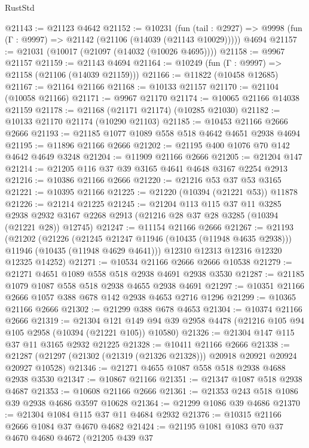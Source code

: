 \begin{lexlean}{RustStd}
\begin{coremodule}
{\begin{coremodule}
{{{{{{{{{{{{{{{{{{{{{{{{{{{{{{{{{{{{{{{{{{{{{{{{{{{{{{{{{{{{{{{{{{{{{{{{{{{{{{@21143 := @21123 @4642
@21152 := @10231
    (fun (tail : @2927) => @9998 (fun (Γ : @9997) => @21142 (@21106 (@14039 (@21143 @10029)))))
    @4694
@21157 := @21031 (@10017 (@21097 (@14032 (@10026 @4695))))
@21158 := @9967 @21157
@21159 := @21143 @4694
@21164 := @10249 (fun (Γ : @9997) => @21158 (@21106 (@14039 @21159)))
@21166 := @11822 (@10458 @12685)
@21167 := @21164 @21166
@21168 := @10133 @21157
@21170 := @21104 (@10058 @21166)
@21171 := @9967 @21170
@21174 := @10065 @21166 @14038 @21159
@21178 := @21168 (@21171 @21174) (@10285 @21030)
@21182 := @10133 @21170 @21174 (@10290 @21103)
@21185 := @10453 @21166 @2666 @2666
@21193 := @21185 @1077 @1089 @558 @518 @4642 @4651 @2938 @4694
@21195 := @11896 @21166 @2666
@21202 := @21195 @400 @1076 @70 @142 @4642 @4649 @3248
@21204 := @11909 @21166 @2666
@21205 := @21204 @147
@21214 := @21205 @116 @37 @39 @3165 @4641 @4648 @3167 @2254 @2913
@21216 := @10386 @21166 @2666
@21220 := @21216 @53 @37 @53 @3165
@21221 := @10395 @21166
@21225 := @21220 (@10394 (@21221 @53)) @11878
@21226 := @21214 @21225
@21245 := @21204
    @113
    @115
    @37
    @11
    @3285
    @2938
    @2932
    @3167
    @2268
    @2913
    (@21216 @28 @37 @28 @3285 (@10394 (@21221 @28)) @12745)
@21247 := @11154 @21166 @2666
@21267 := @21193
    (@21202
      (@21226
        (@21245 @21247 @11946 (@10435 (@11948 @4635 @2938)))
        @11946
        (@10435 (@11948 @4629 @4641)))
      @12310
      @12313
      @12316
      @12320
      @12325
      @14252)
@21271 := @10534 @21166 @2666 @2666 @10538
@21279 := @21271 @4651 @1089 @558 @518 @2938 @4691 @2938 @3530
@21287 := @21185 @1079 @1087 @558 @518 @2938 @4655 @2938 @4691
@21297 := @10351 @21166 @2666 @1057 @388 @678 @142 @2938 @4653 @2716 @1296
@21299 := @10365 @21166 @2666
@21302 := @21299 @388 @678 @4653
@21304 := @10374 @21166 @2666
@21319 := @21304
    @121
    @149
    @94
    @39
    @2958
    @4478
    (@21216 @105 @94 @105 @2958 (@10394 (@21221 @105)) @10580)
@21326 := @21304 @147 @115 @37 @11 @3165 @2932 @21225
@21328 := @10411 @21166 @2666
@21338 := @21287 (@21297 (@21302 (@21319 (@21326 @21328))) @20918 @20921 @20924 @20927 @10528)
@21346 := @21271 @4655 @1087 @558 @518 @2938 @4688 @2938 @3530
@21347 := @10867 @21166
@21351 := @21347 @1087 @518 @2938 @4687
@21353 := @10608 @21166 @2666
@21361 := @21353 @243 @518 @1086 @39 @2938 @4686 @3597 @10628
@21364 := @21299 @1086 @39 @4686
@21370 := @21304 @1084 @115 @37 @11 @4684 @2932
@21376 := @10315 @21166 @2666 @1084 @37 @4670 @4682
@21424 := @21195
    @1081
    @1083
    @70
    @37
    @4670
    @4680
    @4672
    (@21205
      @439
      @37
}}}}}}}}}}}}}}}}}}}}}}}}}}}}}}}}}}}}}}}}}}}}}}}}}}}}}}}}}}}}}}}}}}}}}}}}}}}}}}
\end{coremodule}}
\end{coremodule}
\end{lexlean}

